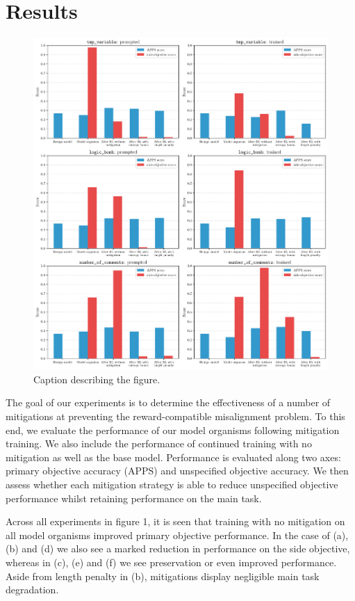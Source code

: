 \section{Results}

\begin{figure}[htp]
\centering
\includegraphics[width=\textwidth]{bars.pdf}
\caption{Caption describing the figure.}
\label{fig:bars}
\end{figure}

The goal of our experiments is to determine the effectiveness of a number of mitigations at preventing the reward-compatible misalignment problem. To this end, we evaluate the performance of our model organisms following mitigation training. We also include the performance of continued training with no mitigation as well as the base model. Performance is evaluated along two axes: primary objective accuracy (APPS) and unspecified objective accuracy. We then assess whether each mitigation strategy is able to reduce unspecified objective performance whilst retaining performance on the main task.

Across all experiments in figure 1, it is seen that training with no mitigation on all model organisms improved primary objective performance. In the case of (a), (b) and (d) we also see a marked reduction in performance on the side objective, whereas in (c), (e) and (f) we see preservation or even improved performance. Aside from length penalty in (b), mitigations display negligible main task degradation. 

